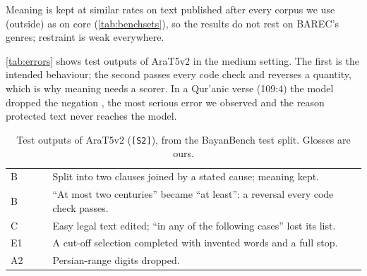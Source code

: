 \documentclass[10pt,a4paper]{article}
\begin{document}
\benchefftable

 Meaning is kept at similar rates on text published after
every corpus we use (outside) as on core (\autoref{tab:benchsets}), so the results
do not rest on BAREC's genres; restraint is weak everywhere.

\benchsetstable

 \autoref{tab:errors} shows test outputs of AraT5v2 in the
medium setting. The first is the intended behaviour; the second passes every code
check and reverses a quantity, which is why meaning needs a scorer. In a Qur'anic
verse (109:4) the model dropped the negation , the most serious error we
observed and the reason protected text never reaches the model.

\begin{table}[h]
\small
\caption{Test outputs of AraT5v2 (\texttt{[S2]}), from the BayanBench test split.
Glosses are ours.}
\label{tab:errors}
\begin{tabularx}{\linewidth}{|C{9mm}|L|L|p{30mm}|}
\hline
{} &  &  &  \\ \hline
B &  &
   &
  Split into two clauses joined by a stated cause; meaning kept. \\ \hline
B &  &
   &
  ``At most two centuries'' became ``at least'': a reversal every code check passes. \\ \hline
C &  &
   &
  Easy legal text edited; ``in any of the following cases'' lost its list. \\ \hline
E1 &  &
   &
  A cut-off selection completed with invented words and a full stop. \\ \hline
A2 &  &  &
  Persian-range digits dropped. \\ \hline
\end{tabularx}
\end{table}
\end{document}
